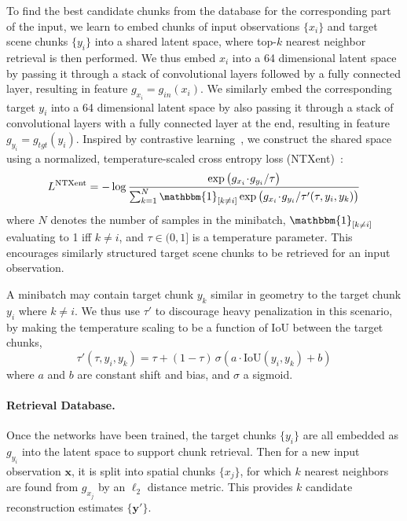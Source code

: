 To find the best candidate chunks from the database for the corresponding part of the input, we learn to embed chunks of input observations $\{x_i\}$ and target scene chunks $\{y_i\}$ into a shared latent space, where top-$k$ nearest neighbor retrieval is then performed.
%
We thus embed $x_i$ into a 64 dimensional latent space by passing it through a stack of convolutional layers followed by a fully connected layer, resulting in feature $g_{x_i} = g_{in}(x_i)$. We similarly embed the corresponding target $y_i$ into a 64 dimensional latent space by also passing it through a stack of convolutional layers with a fully connected layer at the end, resulting in feature $g_{y_i} = g_{tgt}(y_i)$.
%
Inspired by contrastive learning~\cite{hadsell2006dimensionality}, we construct the shared space using a normalized, temperature-scaled cross entropy loss (NTXent)~\cite{chen2020simple}:
\begin{equation}\small
    L^\text{NTXent} = -\log\frac{\exp\left(g_{x_i}\!\cdot\! g_{y_i}/\tau\right)}{\sum^{N}_{k=1}\mathbbm{1}_{[k\neq{i}]}\exp\left(g_{x_i}\!\cdot\!g_{y_i}/\tau'(\tau,y_i, y_k)\right)}
\end{equation}
where $N$ denotes the number of samples in the minibatch, $\mathbbm{1}_{[k\neq{i}]}$ evaluating to 1 iff $k\neq i$, and $\tau \in (0, 1]$ is a temperature parameter.
%
This encourages similarly structured target scene chunks to be retrieved for an input observation.

A minibatch may contain target chunk $y_k$ similar in geometry to the target chunk $y_i$ where $k\neq i$. 
We thus use $\tau'$ to discourage  heavy penalization in this scenario, by making the temperature scaling to be a function of IoU between the target chunks,
\begin{equation}
    \tau'(\tau,y_i, y_k) = \tau + (1 - \tau)\,\sigma\!\left(a\!\cdot\!\mathrm{IoU}\left(y_i, y_k\right) + b\right)
\end{equation}
where $a$ and $b$ are constant shift and bias, and $\sigma$ a sigmoid. 

\paragraph{Retrieval Database.} 

Once the networks have been trained, the target chunks $\{y_i\}$ are all embedded as $g_{y_i}$ into the latent space to support chunk retrieval.
Then for a new input observation $\mathbf{x}$, it is split into spatial chunks $\{x_j\}$, for which $k$ nearest neighbors are found from $g_{x_j}$ by an $\ell_2$ distance metric.
This provides $k$ candidate reconstruction estimates $\{\mathbf{y}'\}$.

